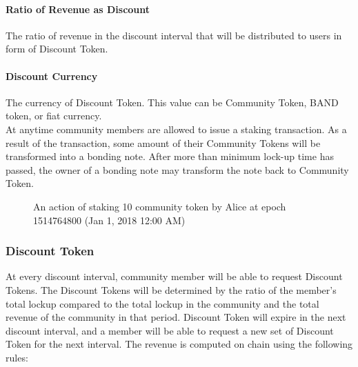 \documentclass[letterpaper,11pt]{article}
\begin{document}
\paragraph{Ratio of Revenue as Discount} The ratio of revenue in the discount interval that will be distributed to users in form of Discount Token.
\paragraph{Discount Currency} The currency of Discount Token. This value can be Community Token, BAND token, or fiat currency. \\

At anytime community members are allowed to issue a staking transaction. As a result of the transaction, some amount of their Community Tokens will be transformed into a bonding note. After more than minimum lock-up time has passed, the owner of a bonding note may transform the note back to Community Token.

\begin{figure}[!h]
\centering
{}
\caption{An action of staking 10 community token by Alice at epoch 1514764800 (Jan 1, 2018 12:00 AM)}
\label{fig:community-stake}
\end{figure}

\subsubsection{Discount Token}
At every discount interval, community member will be able to request Discount Tokens. The Discount Tokens will be determined by the ratio of the member's total lockup compared to the total lockup in the community and the total revenue of the community in that period. Discount Token will expire in the next discount interval, and a member will be able to request a new set of Discount Token for the next interval. The revenue is computed on chain using the following rules:
\end{document}
